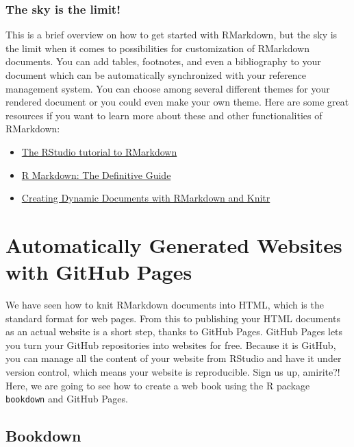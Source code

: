 \documentclass[
]{book}
\providecommand{\tightlist}{%
  \setlength{\itemsep}{0pt}\setlength{\parskip}{0pt}}
\begin{document}
\hypertarget{the-sky-is-the-limit}{%
\subsection{The sky is the limit!}\label{the-sky-is-the-limit}}

This is a brief overview on how to get started with RMarkdown, but the sky is
the limit when it comes to possibilities for customization of RMarkdown
documents. You can add tables, footnotes, and even a bibliography to your
document which can be automatically synchronized with your reference management
system. You can choose among several different themes for your rendered document
or you could even make your own theme. Here are some great resources if you want
to learn more about these and other functionalities of RMarkdown:

\begin{itemize}
\tightlist
\item
  \href{https://rmarkdown.rstudio.com/lesson-1.html}{The RStudio tutorial to RMarkdown}
\item
  \href{https://bookdown.org/yihui/rmarkdown/}{R Markdown: The Definitive Guide}
\item
  \href{https://rstudio-pubs-static.s3.amazonaws.com/180546_e2d5bf84795745ebb5cd3be3dab71fca.html\#1_welcome}{Creating Dynamic Documents with RMarkdown and Knitr}
\end{itemize}

\hypertarget{github-pages}{%
\chapter{Automatically Generated Websites with GitHub Pages}\label{github-pages}}

We have seen how to knit RMarkdown documents into HTML, which is the standard format for web pages. From this to publishing your HTML documents as an actual website is a short step, thanks to GitHub Pages. GitHub Pages lets you turn your GitHub repositories into websites for free. Because it is GitHub, you can manage all the content of your website from RStudio and have it under version control, which means your website is reproducible. Sign us up, amirite?! Here, we are going to see how to create a web book using the R package \texttt{bookdown} and GitHub Pages.

\hypertarget{bookdown}{%
\section{Bookdown}\label{bookdown}}
\end{document}
